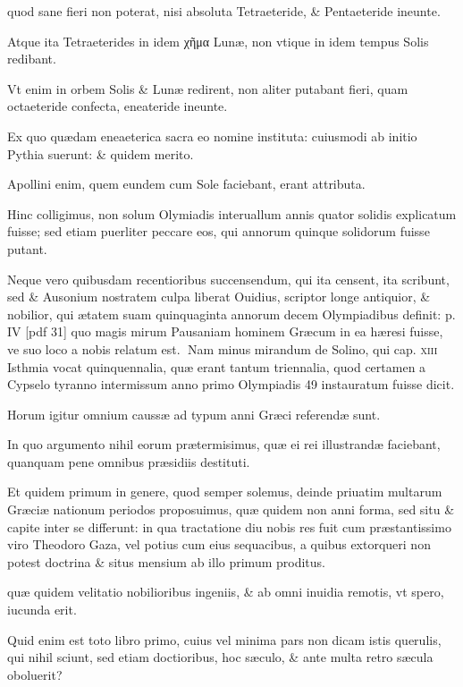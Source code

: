 \begin{parnumbers}
quod sane fieri non poterat, nisi absoluta Tetraeteride, \& Pentaeteride ineunte.

Atque ita Tetraeterides in idem \textgreek{χῆμα} Lunæ, non vtique in idem tempus Solis redibant.

Vt enim in orbem Solis \& Lunæ redirent, non aliter putabant fieri, quam octaeteride confecta, eneateride ineunte.

Ex quo quædam eneaeterica sacra eo nomine instituta: cuiusmodi ab initio Pythia suerunt: \& quidem merito.

Apollini enim, quem eundem cum Sole faciebant, erant attributa.

Hinc colligimus, non solum Olymiadis interuallum annis quator solidis explicatum fuisse; sed etiam puerliter peccare eos, qui annorum quinque solidorum fuisse putant.

Neque vero quibusdam recentioribus succensendum, qui ita censent, ita scribunt, sed \& Ausonium nostratem culpa liberat Ouidius, scriptor longe antiquior, \& nobilior, qui ætatem suam quinquaginta annorum decem Olympiadibus definit:
\clearpage
p. IV [pdf 31]
quo magis mirum Pausaniam hominem Græcum in ea hæresi fuisse, ve suo loco a nobis relatum est.
Nam minus mirandum de Solino, qui cap. \textsc{xiii} Isthmia vocat quinquennalia, quæ erant tantum triennalia, quod certamen a Cypselo tyranno intermissum anno primo Olympiadis 49 instauratum fuisse dicit.

Horum igitur omnium caussæ ad typum anni Græci referendæ sunt.

In quo argumento nihil eorum prætermisimus, quæ ei rei illustrandæ faciebant, quanquam pene omnibus præsidiis destituti.

Et quidem primum in genere, quod semper solemus, deinde priuatim multarum Græciæ nationum periodos proposuimus, quæ quidem non anni forma, sed situ \& capite inter se differunt: in qua tractatione diu nobis res fuit cum præstantissimo viro Theodoro Gaza, vel potius cum eius sequacibus, a quibus extorqueri non potest doctrina \& situs mensium ab illo primum 
proditus. 

quæ quidem velitatio nobilioribus ingeniis, \& ab omni inuidia remotis, vt spero, iucunda erit.

Quid enim est toto libro primo, cuius vel minima pars non dicam istis querulis, qui nihil sciunt, sed etiam doctioribus, hoc sæculo, \& ante multa retro sæcula oboluerit?


\end{parnumbers}
